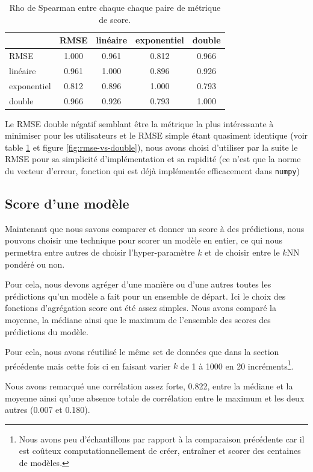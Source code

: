 \documentclass[letterpaper]{article}
\begin{document}
\begin{table}[h]
\centering
\begin{tabular}{|l|c|c|c|c|}
  \hline
  & RMSE & linéaire & exponentiel & double \\
  \hline
RMSE & 1.000 & 0.961 & 0.812 & 0.966 \\
linéaire & 0.961 & 1.000 & 0.896 & 0.926 \\
exponentiel & 0.812 & 0.896 & 1.000 & 0.793 \\
double & 0.966 & 0.926 & 0.793 & 1.000 \\
  \hline
\end{tabular}
  \caption{\label{tab:rho} Rho de Spearman entre chaque chaque paire de métrique de score.}
\end{table}

Le RMSE double négatif semblant être la métrique la plus intéressante à minimiser pour les utilisateurs et le RMSE simple étant quasiment identique (voir table \ref{tab:rho} et figure \ref{fig:rmse-vs-double}), nous avons choisi d'utiliser par la suite le RMSE pour sa simplicité d'implémentation et sa rapidité (ce n'est que la norme du vecteur d'erreur, fonction qui est déjà implémentée efficacement dans \texttt{numpy})

\FloatBarrier
\subsection{Score d'une modèle}

Maintenant que nous savons comparer et donner un score à des prédictions, nous pouvons choisir une technique pour scorer un modèle en entier, ce qui nous permettra entre autres de choisir l'hyper-paramètre $k$ et de choisir entre le $k$NN pondéré ou non.

Pour cela, nous devons agréger d'une manière ou d'une autres toutes les prédictions qu'un modèle a fait pour un ensemble de départ. Ici le choix des fonctions d’agrégation score ont été assez simples. Nous avons comparé la moyenne, la médiane ainsi que le maximum de l'ensemble des scores des prédictions du modèle.

Pour cela, nous avons réutilisé le même set de données que dans la section précédente mais cette fois ci en faisant varier $k$ de 1 à 1000 en 20 incréments\footnote{Nous avons peu d’échantillons par rapport à la comparaison précédente car il est coûteux computationnellement de créer, entraîner et scorer des centaines de modèles.}.

Nous avons remarqué une corrélation assez forte, 0.822, entre la médiane et la moyenne ainsi qu'une absence totale de corrélation entre le maximum et les deux autres (0.007 et 0.180).
\end{document}
